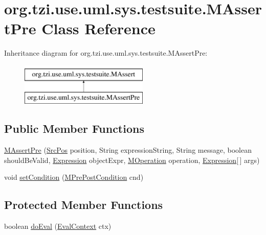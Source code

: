 \hypertarget{classorg_1_1tzi_1_1use_1_1uml_1_1sys_1_1testsuite_1_1_m_assert_pre}{\section{org.\-tzi.\-use.\-uml.\-sys.\-testsuite.\-M\-Assert\-Pre Class Reference}
\label{classorg_1_1tzi_1_1use_1_1uml_1_1sys_1_1testsuite_1_1_m_assert_pre}
}
Inheritance diagram for org.\-tzi.\-use.\-uml.\-sys.\-testsuite.\-M\-Assert\-Pre\-:\begin{figure}[H]
\begin{center}
\leavevmode
\includegraphics[height=2.000000cm]{classorg_1_1tzi_1_1use_1_1uml_1_1sys_1_1testsuite_1_1_m_assert_pre}
\end{center}
\end{figure}
\subsection*{Public Member Functions}
\begin{DoxyCompactItemize}
\item 
\hyperlink{classorg_1_1tzi_1_1use_1_1uml_1_1sys_1_1testsuite_1_1_m_assert_pre_aef10f59531850b51f42b5aaa21cd6bdf}{M\-Assert\-Pre} (\hyperlink{classorg_1_1tzi_1_1use_1_1parser_1_1_src_pos}{Src\-Pos} position, String expression\-String, String message, boolean should\-Be\-Valid, \hyperlink{classorg_1_1tzi_1_1use_1_1uml_1_1ocl_1_1expr_1_1_expression}{Expression} object\-Expr, \hyperlink{classorg_1_1tzi_1_1use_1_1uml_1_1mm_1_1_m_operation}{M\-Operation} operation, \hyperlink{classorg_1_1tzi_1_1use_1_1uml_1_1ocl_1_1expr_1_1_expression}{Expression}\mbox{[}$\,$\mbox{]} args)
\item 
void \hyperlink{classorg_1_1tzi_1_1use_1_1uml_1_1sys_1_1testsuite_1_1_m_assert_pre_aa7300d618ddf4abafe1473d9d302a7ed}{set\-Condition} (\hyperlink{classorg_1_1tzi_1_1use_1_1uml_1_1mm_1_1_m_pre_post_condition}{M\-Pre\-Post\-Condition} cnd)
\end{DoxyCompactItemize}
\subsection*{Protected Member Functions}
\begin{DoxyCompactItemize}
\item 
boolean \hyperlink{classorg_1_1tzi_1_1use_1_1uml_1_1sys_1_1testsuite_1_1_m_assert_pre_a1bcc14742ef5ea240af09ec285800c17}{do\-Eval} (\hyperlink{classorg_1_1tzi_1_1use_1_1uml_1_1ocl_1_1expr_1_1_eval_context}{Eval\-Context} ctx)
\end{DoxyCompactItemize}


